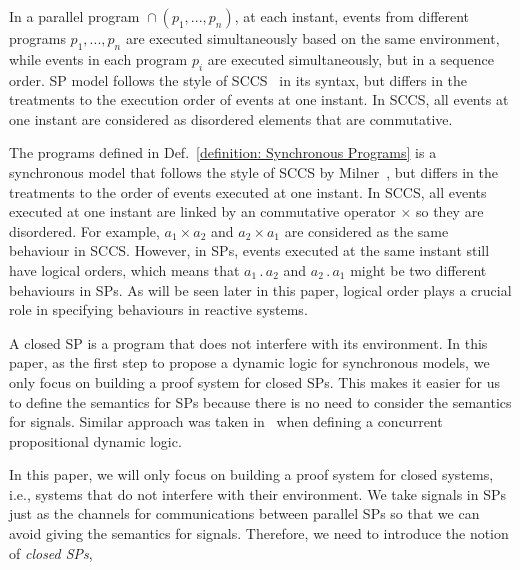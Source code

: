 \documentclass{fcs}
\DeclareMathOperator{\para}{\cap}
\DeclareMathOperator{\nex}{.}
\begin{document}
In a parallel program $\para(p_1,...,p_n)$, at each instant, events from different programs $p_1,...,p_n$ are executed simultaneously based on the same environment, while events in each program $p_i$ are executed simultaneously, but in a sequence order.
SP model follows the style of SCCS~\cite{Milner83} in its syntax, but differs in the treatments to the execution order of events at one instant.
In SCCS, all events at one instant are considered as disordered elements that are commutative.


\ifx
The programs defined in Def.~\ref{definition: Synchronous Programs} is a synchronous model that follows the style of SCCS by Milner~\cite{Milner83},
but differs in the treatments to the order of events executed at one instant.
In SCCS, all events executed at one instant are linked by an commutative operator $\times$ so they are disordered.
For example, $a_1\times a_2$ and $a_2\times a_1$ are considered as the same behaviour in SCCS.
However, in SPs, events executed at the same instant still have logical orders, which means that $a_1\nex a_2$ and $a_2\nex a_1$ might be two different behaviours in SPs.
As will be seen later in this paper, logical order plays a crucial role in specifying behaviours in reactive systems.
\fi




A closed SP is a program that does not interfere with its environment.
In this paper, as the first step to propose a dynamic logic for synchronous models, we only focus on building a proof system for closed SPs.
This makes it easier for us to define the semantics for SPs because there is no need to consider the semantics for signals.
Similar approach was taken in~\cite{Peleg87} when defining a concurrent propositional dynamic logic.

\ifx
In this paper, we will only focus on building a proof system for closed systems, i.e., systems that do not interfere with their environment.
We take signals in SPs just as the channels for communications between parallel SPs so that we can avoid giving the semantics for signals.
Therefore, we need to introduce the notion of \emph{closed SPs},
\end{document}

